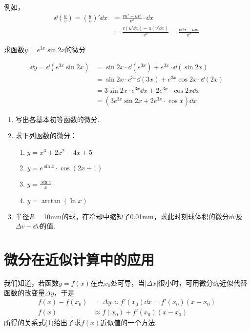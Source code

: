 例如，
\[\begin{split}
    \dd\left(\frac{u}{v}\right)=\left(\frac{u}{v}\right)'\dd x&=\frac{vu'-uv'}{v^2}\cdot \dd x\\
    &=\frac{v(u'\dd x)-u(v'\dd x)}{v^2}=\frac{v\dd u-u\dd v}{v^2}
\end{split}\]

\begin{example}
    求函数$y=e^{3x}\sin 2x$的微分
\end{example}

\begin{solution}
\[\begin{split}
\dd y=\dd (e^{3x}\sin 2x)&=\sin 2x\cdot \dd(e^{3x})+e^{3x}\cdot \dd (\sin2x)\\
&=\sin 2x\cdot e^{3x}\dd (3x)+e^{3x}\cos 2x\cdot \dd(2x)\\
&=3\sin 2x\cdot e^{3x}\dd x+2e^{3x}\cdot \cos2x\dd x\\
&=\left(3e^{3x}\sin2x+2e^{3x}\cdot \cos x\right)\dd x
    \end{split}\]
\end{solution}

\begin{ex}
\begin{enumerate}
    \item 写出各基本初等函数的微分.
    \item 求下列函数的微分：
\begin{multicols}{2}
\begin{enumerate}[(1)]
    \item $y=x^3+2x^2-4x+5$
    \item $y=e^{\sin x}\cdot \cos(2x+1)$
    \item $y=\frac{\sin x}{x}$
    \item $y=\arctan(\ln x)$
\end{enumerate}
\end{multicols}

    \item 半径$R=$10mm的球，在冷却中缩短了0.01mm，求此时刻球体积的微分$\dd v$及$\Delta v-\dd v$的值.
\end{enumerate}
\end{ex}

\section{微分在近似计算中的应用}
我们知道，若函数$y=f(x)$在点$x_0$处可导，当$|\Delta x|$很小时，可用微分$\dd y$近似代替函数的改变量$\Delta y$，于是
\begin{align}
  f(x)-f(x_0)&=\Delta y\approx f'(x_0)\dd x=f'(x_0)(x-x_0)\nonumber\\
f(x)&\approx f(x_0)+f'(x_0)(x-x_0)  \tag{1}
\end{align}
所得的关系式(1)给出了求$f(x)$近似值的一个方法.

